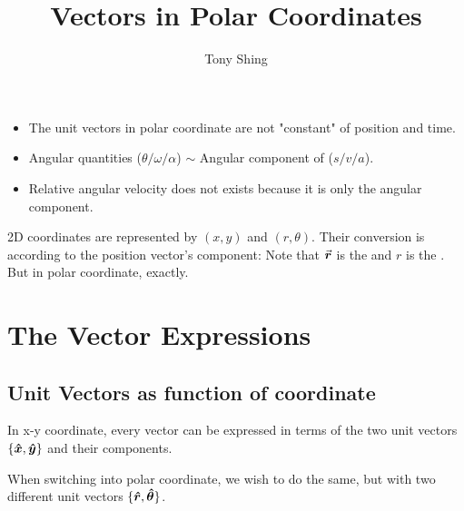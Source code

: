 \documentclass[class=article, crop=false, 12pt]{standalone}
\author{Tony Shing}
\title{Vectors in Polar Coordinates}
\begin{document}
\maketitle


\begin{overview}
    \begin{itemize}
        \item The unit vectors in polar coordinate are not "constant" of position and time.
        \item Angular quantities ($\theta/\omega/\alpha$) $\sim$ Angular component of ($s/v/a$). 
        \item Relative angular velocity does not exists because it is only the angular component.
    \end{itemize}
\end{overview}


\begin{notation}
    2D coordinates are represented by $(x,y)$ and $(r,\theta)$. Their conversion is according to the position vector's component: 
        Note that $\va*{r}$ is the  and $r$ is the . 
        But in polar coordinate,  exactly.

\end{notation}


\section{The Vector Expressions}

\subsection{Unit Vectors as function of coordinate}

In x-y coordinate, every vector can be expressed in terms of the two unit vectors $\{\vu*{x}, \vu*{y}\}$ and their components.

When switching into polar coordinate, we wish to do the same, 
but with two different unit vectors $\{\vu*{r}, \vu*{\theta}\}$.
\end{document}
